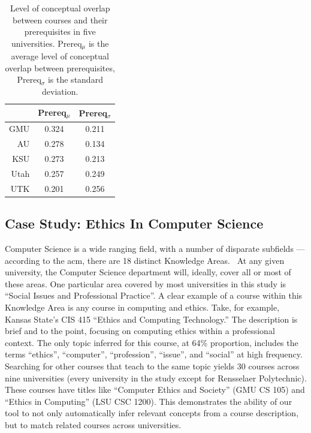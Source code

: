 
\begin{table}
  \centering
  \begin{tabular}{rcc}
    \toprule
     & Prereq$_\mu$ & Prereq$_\sigma$ \\
    \midrule
    GMU  & 0.324 & 0.211 \\
    AU   & 0.278 & 0.134 \\
    KSU  & 0.273 & 0.213 \\
    Utah & 0.257 & 0.249 \\
    UTK  & 0.201 & 0.256 \\
    \bottomrule
  \end{tabular}
  \caption{Level of conceptual overlap between courses and their prerequisites in five universities. Prereq$_\mu$ is the average level of conceptual overlap between prerequisites, Prereq$_\sigma$ is the standard deviation.\label{tbl:prereq-topic-overlap}}
\end{table}


\subsection{Case Study: Ethics In Computer Science}
\label{sec:eval-topics}


Computer Science is a wide ranging field, with a number of disparate subfields --- according to the \ac{acm}, there are 18 distinct Knowledge Areas.~\cite{CS2013}
At any given university, the Computer Science department will, ideally, cover all or most of these areas.
One particular area covered by most universities in this study is ``Social Issues and Professional Practice''.
A clear example of a course within this Knowledge Area is any course in computing and ethics.
Take, for example, Kansas State's CIS 415 ``Ethics and Computing Technology.''
The description is brief and to the point, focusing on computing ethics within a professional context.
The only topic inferred for this course, at 64\% proportion, includes the terms ``ethics'', ``computer'', ``profession'', ``issue'', and ``social'' at high frequency.
Searching for other courses that teach to the same topic yields 30 courses across nine universities (every university in the study except for Rensselaer Polytechnic).
These courses have titles like ``Computer Ethics and Society'' (GMU CS 105) and ``Ethics in Computing'' (LSU CSC 1200).
This demonstrates the ability of our tool to not only automatically infer relevant concepts from a course description, but to match related courses across universities.


